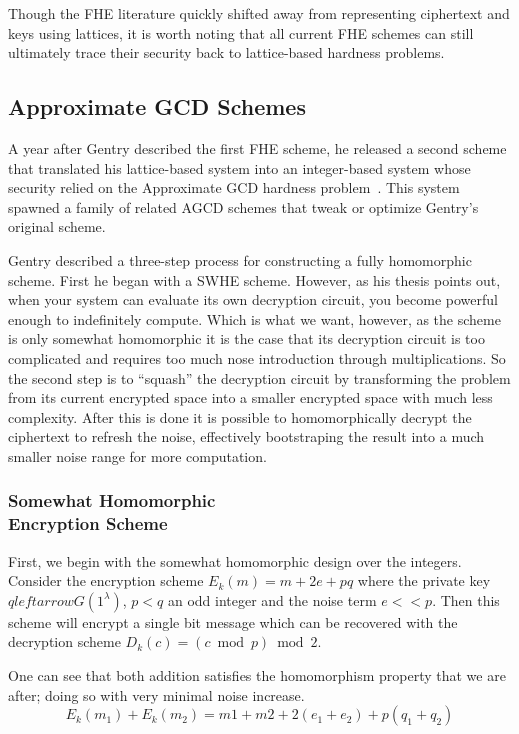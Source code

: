 \documentclass[letterpaper,twocolumn,10pt]{article}
\begin{document}
Though the FHE literature quickly shifted away from representing ciphertext and keys using lattices, it is worth noting that all current FHE schemes can still ultimately trace their security back to lattice-based hardness problems. 

\subsection{Approximate GCD Schemes}
A year after Gentry described the first FHE scheme, he released a second scheme that translated his lattice-based system into an integer-based system whose security relied on the Approximate GCD hardness problem~\cite{DGHV}. This system spawned a family of related AGCD schemes that tweak or optimize Gentry's original scheme.

Gentry described a three-step process for constructing a fully homomorphic scheme. First he began with a SWHE scheme. However, as his thesis points out, when your system can evaluate its own decryption circuit, you become powerful enough to indefinitely compute. Which is what we want, however, as the scheme is only somewhat homomorphic it is the case that its decryption circuit is too complicated and requires too much nose introduction through multiplications. So the second step is to ``squash'' the decryption circuit by transforming the problem from its current encrypted space into a smaller encrypted space with much less complexity. After this is done it is possible to homomorphically decrypt the ciphertext to refresh the noise, effectively bootstraping the result into a much smaller noise range for more computation.

\subsubsection{Somewhat Homomorphic \\Encryption Scheme} 
First, we begin with the somewhat homomorphic design over the integers. Consider the encryption scheme $E_k(m) = m + 2e + pq$ where the private key $q leftarrow G(1^\lambda)$, $p < q$ an odd integer and the noise term $e << p$. Then this scheme will encrypt a single bit message which can be recovered with the decryption scheme $D_k(c) = (c \bmod p) \bmod 2$.

One can see that both addition satisfies the homomorphism property that we are after; doing so with very minimal noise increase.
$$E_k(m_1)+E_k(m_2)=m1+m2 + 2(e_1+e_2) + p(q_1+q_2)$$
\end{document}
